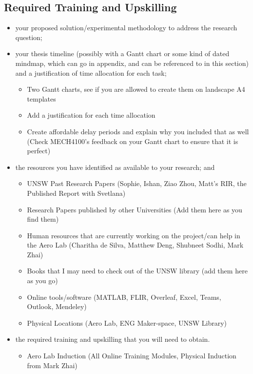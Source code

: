 \subsection{Required Training and Upskilling}
\begin{itemize}
    \item your proposed solution/experimental methodology to address the research question;
    \item your thesis timeline (possibly with a Gantt chart or some kind of dated mindmap, which can go in appendix, and can be referenced to in this section) and a justification of time allocation for each task;
    \begin{itemize}
        \item Two Gantt charts, see if you are allowed to create them on landscape A4 templates
        \item Add a justification for each time allocation
        \item Create affordable delay periods and explain why you included that as well (Check MECH4100's feedback on your Gantt chart to ensure that it is perfect)
    \end{itemize}
    \item the resources you have identified as available to your research; and
    \begin{itemize}
        \item UNSW Past Research Papers (Sophie, Ishan, Ziao Zhou, Matt's RIR, the Published Report with Svetlana)
        \item Research Papers published by other Universities (Add them here as you find them)
        \item Human resources that are currently working on the project/can help in the Aero Lab (Charitha de Silva, Matthew Deng, Shubneet Sodhi, Mark Zhai)
        \item Books that I may need to check out of the UNSW library (add them here as you go)
        \item Online tools/software (MATLAB, FLIR, Overleaf, Excel, Teams, Outlook, Mendeley)
        \item Physical Locations (Aero Lab, ENG Maker-space, UNSW Library)
    \end{itemize}
    \item the required training and upskilling that you will need to obtain.
    \begin{itemize}
        \item Aero Lab Induction (All Online Training Modules, Physical Induction from Mark Zhai)

\end{itemize}
\end{itemize}
